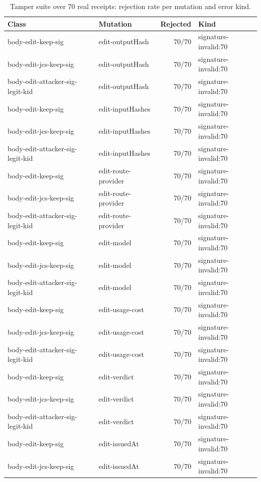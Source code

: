 \begin{table}[t]\centering\caption{Tamper suite over 70 real receipts: rejection rate per mutation and error kind.}\label{tab:tamper}\scriptsize\begin{tabular}{@{}llrl@{}}\toprule Class & Mutation & Rejected & Kind\\\midrule
body-edit-keep-sig & edit-outputHash & 70/70 & signature-invalid:70\\
body-edit-jcs-keep-sig & edit-outputHash & 70/70 & signature-invalid:70\\
body-edit-attacker-sig-legit-kid & edit-outputHash & 70/70 & signature-invalid:70\\
body-edit-keep-sig & edit-inputHashes & 70/70 & signature-invalid:70\\
body-edit-jcs-keep-sig & edit-inputHashes & 70/70 & signature-invalid:70\\
body-edit-attacker-sig-legit-kid & edit-inputHashes & 70/70 & signature-invalid:70\\
body-edit-keep-sig & edit-route-provider & 70/70 & signature-invalid:70\\
body-edit-jcs-keep-sig & edit-route-provider & 70/70 & signature-invalid:70\\
body-edit-attacker-sig-legit-kid & edit-route-provider & 70/70 & signature-invalid:70\\
body-edit-keep-sig & edit-model & 70/70 & signature-invalid:70\\
body-edit-jcs-keep-sig & edit-model & 70/70 & signature-invalid:70\\
body-edit-attacker-sig-legit-kid & edit-model & 70/70 & signature-invalid:70\\
body-edit-keep-sig & edit-usage-cost & 70/70 & signature-invalid:70\\
body-edit-jcs-keep-sig & edit-usage-cost & 70/70 & signature-invalid:70\\
body-edit-attacker-sig-legit-kid & edit-usage-cost & 70/70 & signature-invalid:70\\
body-edit-keep-sig & edit-verdict & 70/70 & signature-invalid:70\\
body-edit-jcs-keep-sig & edit-verdict & 70/70 & signature-invalid:70\\
body-edit-attacker-sig-legit-kid & edit-verdict & 70/70 & signature-invalid:70\\
body-edit-keep-sig & edit-issuedAt & 70/70 & signature-invalid:70\\
body-edit-jcs-keep-sig & edit-issuedAt & 70/70 & signature-invalid:70\\

\end{tabular}
\end{table}
